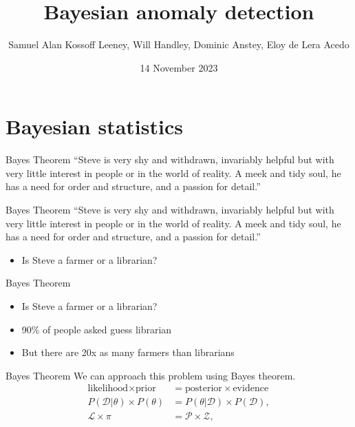\documentclass{beamer}
\title{Bayesian anomaly detection}
\date{14 November 2023}
\author{Samuel Alan Kossoff Leeney, Will Handley, Dominic Anstey, Eloy de Lera Acedo}
\institute{University of Cambridge}
\begin{document}
  \maketitle
  \section{Bayesian statistics}
  \begin{frame}{Bayes Theorem}
    ``Steve is very shy and withdrawn, invariably helpful but with very little interest in people or in the world of reality. A meek and tidy soul, he has a need for order and structure, and a passion for detail.''
  \end{frame}

  \begin{frame}{Bayes Theorem}
    ``Steve is very shy and withdrawn, invariably helpful but with very little interest in people or in the world of reality. A meek and tidy soul, he has a need for order and structure, and a passion for detail.''

    \begin{itemize}
    \item Is Steve a farmer or a librarian?
    \end{itemize}

  \end{frame}

  \begin{frame}{Bayes Theorem}
    \begin{itemize}
      \item Is Steve a farmer or a librarian?
      \item 90\% of people asked guess librarian~\cite{tversky1986framing}
      \item But there are 20x as many farmers than librarians

    \end{itemize}
    \vfill
  \end{frame}

  \begin{frame}{Bayes Theorem}
    We can approach this problem using Bayes theorem.
    \begin{align}
            \text{likelihood} \times \text{prior} &= \text{posterior} \times \text{evidence} \\
            P(\mathcal{D}|\theta) \times P(\theta) &= P(\theta|\mathcal{D}) \times P(\mathcal{D}), \\
            \mathcal{L} \times \pi &= \mathcal{P} \times \mathcal{Z},
        \end{align}
   \end{frame}
\end{document}

